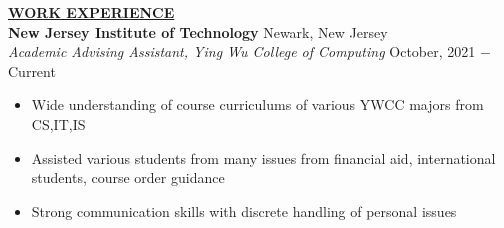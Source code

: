\documentclass{article}
\begin{document}




% 
%
\noindent \textbf{\underline{WORK EXPERIENCE}} \\
\noindent \textbf{New Jersey Institute of Technology} \hfill Newark, New Jersey \\
\textit{Academic Advising Assistant, Ying Wu College of Computing} \hfill October, 2021 $-$ Current
\begin{itemize}[noitemsep,nolistsep,leftmargin=*]
\item {Wide understanding of course curriculums of various YWCC majors from CS,IT,IS }
\item {Assisted various students from many issues from financial aid, international students, course order guidance}
\item {Strong communication skills with discrete handling of personal issues \\}
\end{itemize}

\end{document}
